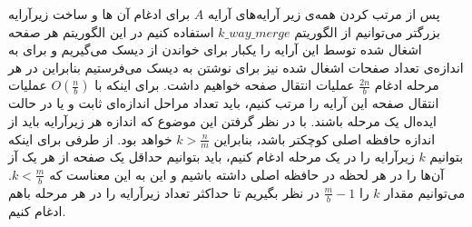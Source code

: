\documentclass[]{article}
\begin{document}
پس از مرتب کردن همه‌ی زیر آرایه‌های آرایه $A$
برای ادغام آن ها و ساخت زیرآرایه بزرگتر می‌توانیم از الگوریتم $k\_way\_merge$
استفاده کنیم در این الگوریتم هر صفحه اشغال شده توسط این آرایه را یکبار برای خواندن از
دیسک می‌گیریم و برای به اندازه‌ی تعداد صفحات اشغال شده نیز برای نوشتن به دیسک می‌فرستیم
بنابراین در هر مرحله ادغام $\displaystyle \frac{2n}{b}$ عملیات انتقال صفحه خواهیم داشت.
برای اینکه با $O(\frac{n}{b})$ عملیات انتقال صفحه این آرایه را مرتب کنیم، 
باید تعداد مراحل اندازه‌ای ثابت و یا در حالت ایده‌ال یک مرحله باشند.
با در نظر گرفتن این موضوع که اندازه هر زیرآرایه باید از اندازه حافظه اصلی کوچکتر باشد،
بنابراین $\displaystyle k > \frac{n}{m}$ خواهد بود.
از طرفی برای اینکه بتوانیم $k$ زیرآرایه را در یک مرحله ادغام کنیم، باید بتوانیم حداقل
یک صفحه از هر یک آز آن‌ها را در هر لحظه در حافظه اصلی داشته باشیم و این به این معناست که
$\displaystyle k < \frac{m}{b}$. می‌توانیم مقدار $k$ را $\displaystyle \frac{m}{b} - 1$
در نظر بگیریم تا حداکثر تعداد زیرآرایه را در هر مرحله باهم ادغام کنیم.
\end{document}
